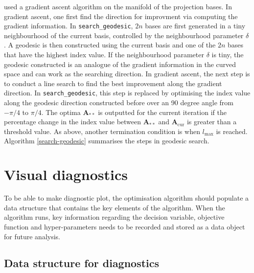 \documentclass[12pt]{article}
\begin{document}
\citet{cook1995grand} used a gradient ascent algorithm on the manifold of the projection bases. In gradient ascent, one first find the direction for improvment via computing the gradient information. In \texttt{search\_geodesic}, \(2n\) bases are first generated in a tiny neighbourhood of the current basis, controlled by the neighbourhood parameter \(\delta\). A geodesic is then constructed using the current basis and one of the \(2n\) bases that have the highest index value. If the neighbourhood parameter \(\delta\) is tiny, the geodesic constructed is an analogue of the gradient information in the curved space and can work as the searching direction. In gradient ascent, the next step is to conduct a line search to find the best improvement along the gradient direction. In \texttt{search\_geodesic}, this step is replaced by optimising the index value along the geodesic direction constructed before over an 90 degree angle from \(-\pi/4\) to \(\pi/4\). The optima \(\mathbf{A}_{**}\) is outputted for the current iteration if the percentage change in the index value between \(\mathbf{A}_{**}\) and \(\mathbf{A}_{\text{cur}}\) is greater than a threshold value. As above, another termination condition is when \(l_{\max}\) is reached. Algorithm \ref{search-geodesic} summarises the steps in geodesic search.

\hypertarget{vis-diag}{%
\section{Visual diagnostics}\label{vis-diag}}

To be able to make diagnostic plot, the optimisation algorithm should populate a data structure that contains the key elements of the algorithm. When the algorithm runs, key information regarding the decision variable, objective function and hyper-parameters needs to be recorded and stored as a data object for future analysis.

\hypertarget{data-structure-for-diagnostics}{%
\subsection{Data structure for diagnostics}\label{data-structure-for-diagnostics}}
\end{document}
